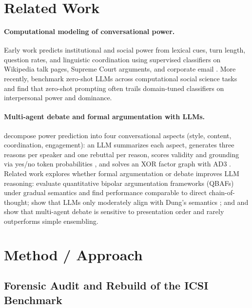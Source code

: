 \documentclass[11pt]{article}
\begin{document}
\section{Related Work}
\label{sec:related}

\paragraph{Computational modeling of conversational power.}
Early work predicts institutional and social power from lexical cues, turn length, question rates, and linguistic coordination using supervised classifiers on Wikipedia talk pages, Supreme Court arguments, and corporate email \citep{danescu2012echoes,prabhakaran2014power}.
More recently, \citet{ziems2024css} benchmark zero-shot LLMs across computational social science tasks and find that zero-shot prompting often trails domain-tuned classifiers on interpersonal power and dominance.

\paragraph{Multi-agent debate and formal argumentation with LLMs.}
\citet{wu2025power} decompose power prediction into four conversational aspects (style, content, coordination, engagement): an LLM summarizes each aspect, generates three reasons per speaker and one rebuttal per reason, scores validity and grounding via yes/no token probabilities \citep{kassner2023rationality}, and solves an XOR factor graph with AD3 \citep{martins2011augmented}.
Related work explores whether formal argumentation or debate improves LLM reasoning: \citet{freedman2025argllm} evaluate quantitative bipolar argumentation frameworks (QBAFs) under gradual semantics and find performance comparable to direct chain-of-thought; \citet{sanayei2025debates} show that LLMs only moderately align with Dung's semantics \citep{dung1995acceptability}; and \citet{smit2024mad} and \citet{khan2024debating} show that multi-agent debate is sensitive to presentation order and rarely outperforms simple ensembling.

\section{Method / Approach}
\label{sec:method}

\subsection{Forensic Audit and Rebuild of the ICSI Benchmark}
\label{sec:method-data}
\end{document}
